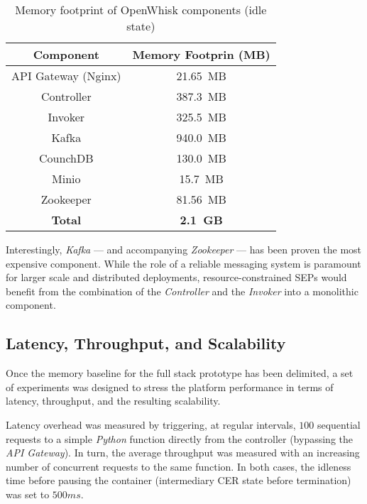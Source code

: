 \begin{table}[tbp]
\renewcommand{\arraystretch}{1.3}
\caption{Memory footprint of OpenWhisk components (idle state)}
\label{tab:OPENWHISK_MEM_FOOTPRINT}
\centering
\begin{tabular}{|c|c|}
\hline
\textbf{Component} & \textbf{Memory Footprin (MB)}\\
\hline
API Gateway (Nginx) & 21.65~MB\\
\hline
Controller          & 387.3~MB\\
\hline
Invoker             & 325.5~MB\\
\hline
Kafka               & 940.0~MB\\
\hline
CounchDB            & 130.0~MB\\
\hline
Minio               & 15.7~MB\\
\hline
Zookeeper           & 81.56~MB\\
\hline
\textbf{Total}      & \textbf{2.1~GB}\\
\hline
\end{tabular}
\end{table}


Interestingly, \textit{Kafka} --- and accompanying \textit{Zookeeper} --- has been proven the most expensive component. While the role of a reliable messaging system is paramount for larger scale and distributed deployments, resource-constrained SEPs would benefit from the combination of the \textit{Controller} and the \textit{Invoker} into a monolithic component.

\subsection{Latency, Throughput, and Scalability}

Once the memory baseline for the full stack prototype has been delimited, a set of experiments was designed to stress the platform performance in terms of latency, throughput, and the resulting scalability.

Latency overhead was measured by triggering, at regular intervals, $100$ sequential requests to a simple \textit{Python} function directly from the controller (bypassing the \textit{API Gateway}). In turn, the average throughput was measured with an increasing number of concurrent requests to the same function. In both cases, the idleness time before pausing the container (intermediary CER state before termination) was set to $500ms$.

